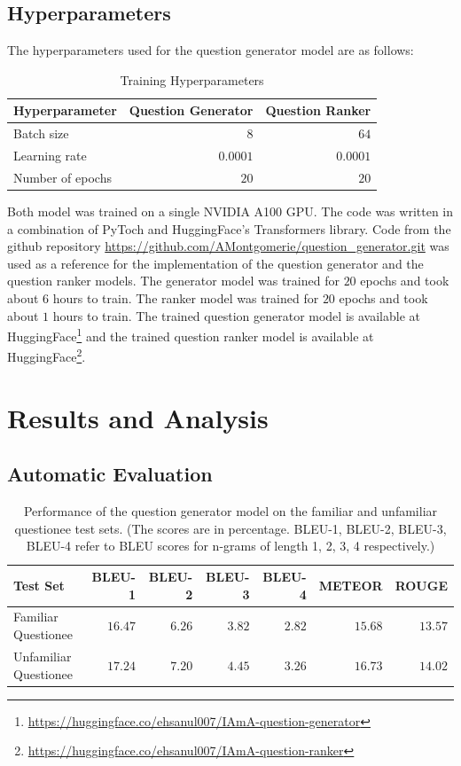 \documentclass[paper=a4, fontsize=11pt]{scrartcl}
\numberwithin{equation}{section}		%
\numberwithin{figure}{section}			%
\numberwithin{table}{section}				%
\begin{document}
\subsection*{Hyperparameters}
The hyperparameters used for the question generator model are as follows:

\begin{table}
  \tiny
  \centering
  \begin{tabular}{lrr}
    \hline
    \textbf{Hyperparameter} & \textbf{Question Generator} & \textbf{Question Ranker} \\
    \hline
    Batch size & $8$ & $64$ \\
    Learning rate & $0.0001$ & $0.0001$ \\
    Number of epochs & $20$ & $20$ \\
    \hline
  \end{tabular}
  \caption{Training Hyperparameters}
  \label{tab:hyperparams_qg}
\end{table}

Both model was trained on a single NVIDIA A100 GPU.
The code was written in a combination of PyToch and HuggingFace's Transformers library.
Code from the github repository \url{https://github.com/AMontgomerie/question_generator.git} was used as a reference for the implementation of the question generator and the question ranker models.
The generator model was trained for $20$ epochs and took about $6$ hours to train.
The ranker model was trained for $20$ epochs and took about $1$ hours to train.
The trained question generator model is available at HuggingFace\footnote{\url{https://huggingface.co/ehsanul007/IAmA-question-generator}} and the trained question ranker model is available at HuggingFace\footnote{\url{https://huggingface.co/ehsanul007/IAmA-question-ranker}}.


\section{Results and Analysis}

\subsection*{Automatic Evaluation}

\begin{table}
  \footnotesize
  \centering
  \begin{tabular}{lrrrrrr}
    \hline
    Test Set & BLEU-1 & BLEU-2 & BLEU-3 & BLEU-4 & METEOR & ROUGE \\
    \hline
    Familiar Questionee & $16.47$ & $6.26$ & $3.82$ & $2.82$ & $15.68$ & $13.57$ \\
    Unfamiliar Questionee & $17.24$ & $7.20$ & $4.45$ & $3.26$ & $16.73$ & $14.02$ \\
    \hline
  \end{tabular}
  \caption{Performance of the question generator model on the familiar and unfamiliar questionee test sets. (The scores are in percentage. BLEU-1, BLEU-2, BLEU-3, BLEU-4 refer to BLEU scores for n-grams of length 1, 2, 3, 4 respectively.)}
  \label{tab:qg_results}
\end{table}
\end{document}
